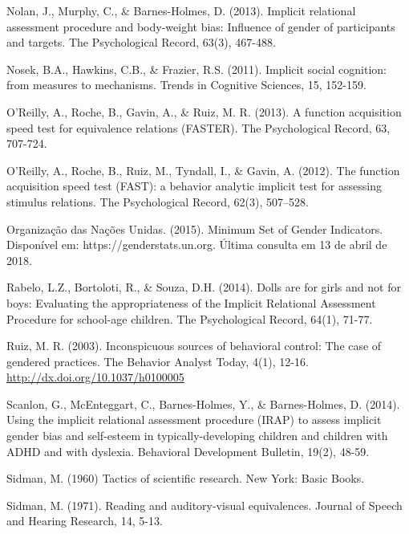 \hangindent=25pt
\noindent Nolan, J., Murphy, C., \& Barnes-Holmes, D. (2013). Implicit relational assessment procedure and body-weight bias: Influence of gender of participants and targets. The Psychological Record, 63(3), 467-488.

\hangindent=25pt
\noindent Nosek, B.A., Hawkins, C.B., \& Frazier, R.S. (2011). Implicit social cognition: from measures to mechanisms. Trends in Cognitive Sciences, 15, 152-159.

\hangindent=25pt
\noindent O'Reilly, A., Roche, B., Gavin, A., \& Ruiz, M. R. (2013). A function acquisition speed test for equivalence relations (FASTER). The Psychological Record, 63, 707-724.

\hangindent=25pt
\noindent O'Reilly, A., Roche, B., Ruiz, M., Tyndall, I., \& Gavin, A. (2012). The function acquisition speed test (FAST): a behavior analytic implicit test for assessing stimulus relations. The Psychological Record, 62(3), 507–528.

\hangindent=25pt
\noindent Organização das Nações Unidas. (2015). Minimum Set of Gender Indicators. Disponível em: https://genderstats.un.org. Última consulta em 13 de abril de 2018.

\hangindent=25pt
\noindent Rabelo, L.Z., Bortoloti, R., \& Souza, D.H. (2014). Dolls are for girls and not for boys: Evaluating the appropriateness of the Implicit Relational Assessment Procedure for school-age children. The Psychological Record, 64(1), 71-77.

\hangindent=25pt
\noindent Ruiz, M. R. (2003). Inconspicuous sources of behavioral control: The case of gendered practices. The Behavior Analyst Today, 4(1), 12-16. \url{http://dx.doi.org/10.1037/h0100005}

\hangindent=25pt
\noindent Scanlon, G., McEnteggart, C., Barnes-Holmes, Y., \& Barnes-Holmes, D. (2014). Using the implicit relational assessment procedure (IRAP) to assess implicit gender bias and self-esteem in typically-developing children and children with ADHD and with dyslexia. Behavioral Development Bulletin, 19(2), 48-59.

\hangindent=25pt
\noindent Sidman, M. (1960) Tactics of scientific research. New York: Basic Books.

\hangindent=25pt
\noindent Sidman, M. (1971). Reading and auditory-visual equivalences. Journal of Speech and Hearing Research, 14, 5-13.

